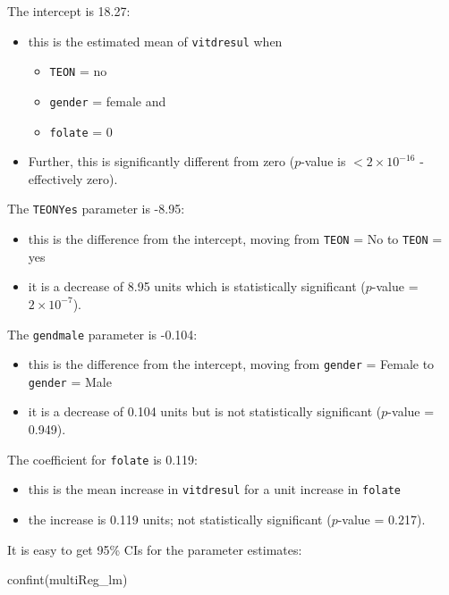 \documentclass[
  oneside]{krantz}
\newenvironment{Shaded}{\begin{snugshade}}{\end{snugshade}}
\newcommand{\FunctionTok}[1]{\textcolor[rgb]{0.00,0.00,0.00}{#1}}
\newcommand{\NormalTok}[1]{#1}
\providecommand{\tightlist}{%
  \setlength{\itemsep}{0pt}\setlength{\parskip}{0pt}}
\begin{document}
The intercept is 18.27:

\begin{itemize}
\item
  this is the estimated mean of \texttt{vitdresul} when

  \begin{itemize}
  \tightlist
  \item
    \texttt{TEON} = no
  \item
    \texttt{gender} = female and
  \item
    \texttt{folate} = 0
  \end{itemize}
\item
  Further, this is significantly different from zero (\(p\)-value is \(<2\times 10^{-16}\) - effectively zero).
\end{itemize}

The \texttt{TEONYes} parameter is -8.95:

\begin{itemize}
\tightlist
\item
  this is the difference from the intercept, moving from \texttt{TEON} = No to \texttt{TEON} = yes
\item
  it is a decrease of 8.95 units which is statistically significant (\(p\)-value = \(2\times 10^{-7}\)).
\end{itemize}

The \texttt{gendmale} parameter is -0.104:

\begin{itemize}
\tightlist
\item
  this is the difference from the intercept, moving from \texttt{gender} = Female to \texttt{gender} = Male
\item
  it is a decrease of 0.104 units but is not statistically significant (\(p\)-value = 0.949).
\end{itemize}

The coefficient for \texttt{folate} is 0.119:

\begin{itemize}
\tightlist
\item
  this is the mean increase in \texttt{vitdresul} for a unit increase in \texttt{folate}
\item
  the increase is 0.119 units; not statistically significant (\(p\)-value = 0.217).
\end{itemize}

It is easy to get 95\% CIs for the parameter estimates:

\begin{Shaded}
\begin{Highlighting}[]
\FunctionTok{confint}\NormalTok{(multiReg\_lm)}
\end{Highlighting}
\end{Shaded}
\end{document}
